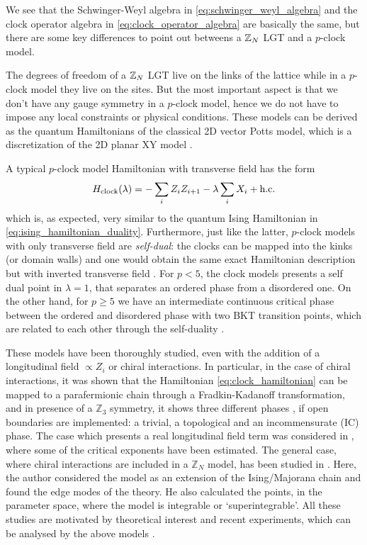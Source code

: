 We see that the Schwinger-Weyl algebra in \eqref{eq:schwinger_weyl_algebra} and the clock operator algebra in \eqref{eq:clock_operator_algebra} are basically the same, but there are some key differences to point out betweens a $\mathbb{Z}_N$ LGT and a $p$-clock model.

The degrees of freedom of a $\mathbb{Z}_N$ LGT live on the links of the lattice while in a $p$-clock model they live on the sites.
But the most important aspect is that we don't have any gauge symmetry in a $p$-clock model, hence we do not have to impose any local constraints or physical conditions.
These models can be derived as the quantum Hamiltonians of the classical 2D vector Potts model, which is a discretization of the 2D planar XY model \cite{ortiz2012dualities}.

A typical $p$-clock model Hamiltonian with transverse field has the form
\begin{equation}
    H_{\text{clock}}(\lambda) = - \sum_{i} Z_i Z_{i+1} - \lambda \sum_{i} X_i + \text{h.c.}
    \label{eq:clock_hamiltonian}
\end{equation}
which is, as expected, very similar to the quantum Ising Hamiltonian in \eqref{eq:ising_hamiltonian_duality}.
Furthermore, just like the latter, $p$-clock models with only transverse field are \emph{self-dual}:
the clocks can be mapped into the kinks (or domain walls) and one would obtain the same exact Hamiltonian description but with inverted transverse field \cite{ortiz2012dualities}.
For $p < 5$, the clock models presents a self dual point in $\lambda = 1$, that separates an ordered phase from a disordered one.
On the other hand, for $p \geq 5$ we have an intermediate continuous critical phase between the ordered and disordered phase with two BKT transition points, which are related to each other through the self-duality \cite{sun2019phase}.

These models have been thoroughly studied, even with the addition of a longitudinal field $\propto Z_i$ \cite{baxter1982exactlysm} or chiral interactions.
In particular, in the case of chiral interactions, it was shown \cite{fendley2012parafermions} that the Hamiltonian \eqref{eq:clock_hamiltonian} can be mapped to a parafermionic chain through a Fradkin-Kadanoff transformation, and in presence of a $\mathbb{Z}_3$ symmetry, it shows three different phases \cite{zhuang2015clock}, if open boundaries are implemented: a trivial, a topological and an incommensurate (IC) phase.
The case which presents a real longitudinal field term was considered in \cite{huang2019clock},  where some of the critical exponents have been estimated.
The general case, where chiral interactions are included in a $\mathbb{Z}_N$ model, has been studied in \cite{fendley2012parafermions}.
Here, the author considered the model as an extension of the Ising/Majorana chain and found the edge modes of the theory.
He also calculated the points, in the parameter space, where the model is integrable or `superintegrable'.
All these studies are motivated by theoretical interest and recent experiments, which can be analysed by the above models \cite{bernien2017probing}.


